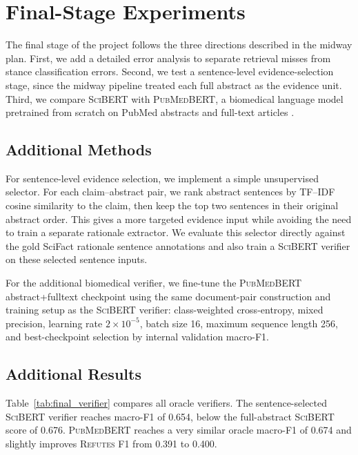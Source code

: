 \documentclass[11pt]{article}
\begin{document}
\section{Final-Stage Experiments}
The final stage of the project follows the three directions described in the midway plan. First, we add a detailed error analysis to separate retrieval misses from stance classification errors. Second, we test a sentence-level evidence-selection stage, since the midway pipeline treated each full abstract as the evidence unit. Third, we compare \textsc{SciBERT} with \textsc{PubMedBERT}, a biomedical language model pretrained from scratch on PubMed abstracts and full-text articles \citep{gu2021domain}.

\subsection{Additional Methods}
For sentence-level evidence selection, we implement a simple unsupervised selector. For each claim--abstract pair, we rank abstract sentences by TF--IDF cosine similarity to the claim, then keep the top two sentences in their original abstract order. This gives a more targeted evidence input while avoiding the need to train a separate rationale extractor. We evaluate this selector directly against the gold SciFact rationale sentence annotations and also train a \textsc{SciBERT} verifier on these selected sentence inputs.

For the additional biomedical verifier, we fine-tune the \textsc{PubMedBERT} abstract+fulltext checkpoint using the same document-pair construction and training setup as the \textsc{SciBERT} verifier: class-weighted cross-entropy, mixed precision, learning rate $2\times10^{-5}$, batch size 16, maximum sequence length 256, and best-checkpoint selection by internal validation macro-F1.

\subsection{Additional Results}
Table~\ref{tab:final_verifier} compares all oracle verifiers. The sentence-selected \textsc{SciBERT} verifier reaches macro-F1 of 0.654, below the full-abstract \textsc{SciBERT} score of 0.676. \textsc{PubMedBERT} reaches a very similar oracle macro-F1 of 0.674 and slightly improves \textsc{Refutes} F1 from 0.391 to 0.400.
\end{document}
